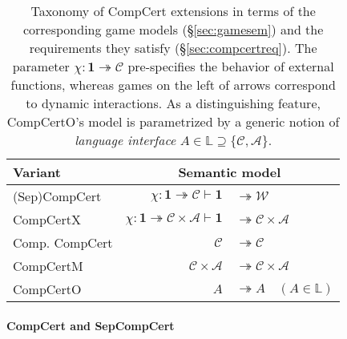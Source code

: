 \documentclass[sigplan,10pt,review]{acmart}
\newcommand{\figsize}{\small}
\begin{document}
\begin{table} %
  \caption{Taxonomy of CompCert extensions
    in terms of the corresponding game models (\S\ref{sec:gamesem})
    and the requirements they satisfy (\S\ref{sec:compcertreq}).
    The parameter $\chi : \mathbf{1} \twoheadrightarrow \mathcal{C}$
    pre-specifies the behavior of external functions,
    whereas games on the left of arrows
    correspond to dynamic interactions.
    As a distinguishing feature,
    CompCertO's model is parametrized by a generic notion of
    \emph{language interface}
    $A \in \mathbb{L} \supseteq \{\mathcal{C}, \mathcal{A}\}$.
  }
  \label{tbl:compcerts}
  \figsize
  \begin{tabular}{l@{\qquad}r@{}l}
    \hline
    Variant & \multicolumn{2}{c}{Semantic model} \\ %
    \hline
    (Sep)CompCert \cite{compcert,sepcompcert} &
      $\chi : \mathbf{1} \twoheadrightarrow \mathcal{C}
      \vdash \mathbf{1} $ & ${} \twoheadrightarrow \mathcal{W}$ \\
    CompCertX \cite{popl15} &
      \hspace{-1em}
      $\chi : \mathbf{1} \twoheadrightarrow \mathcal{C} \times \mathcal{A}
       \vdash
       \mathbf{1} $ & ${} \twoheadrightarrow \mathcal{C} \times \mathcal{A}$
       \\
    Comp. CompCert \cite{compcompcert} &
      $\mathcal{C}$ & ${} \twoheadrightarrow \mathcal{C}$ \\
    CompCertM \cite{compcertm} &
      $\mathcal{C} \times \mathcal{A} $ & ${}\twoheadrightarrow
       \mathcal{C} \times \mathcal{A}$ \\
    CompCertO &
      $A $ & ${}\twoheadrightarrow A \quad
      (A \in \mathbb{L})$ \\
    \hline
  \end{tabular}
\end{table}

\paragraph{CompCert and SepCompCert} %
\end{document}
